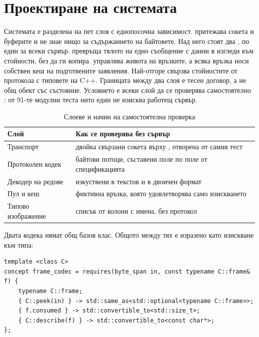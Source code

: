 \section{Проектиране на системата}
\label{sec:design}

Системата е разделена на пет слоя с еднопосочна зависимост.  притежава
сокета и буферите и не знае нищо за съдържанието на байтовете. Над него стоят два
, по един за всеки сървър.  превръща тялото
на едно съобщение с данни в изгледи към стойности, без да ги копира.  управлява
живота на връзките, а всяка връзка носи собствен кеш на подготвените заявления. Най-отгоре
 свързва стойностите от протокола с типовете на C++.
Границата между два слоя е тесен договор, а не общ обект със състояние. Условието е всеки
слой да се проверява самостоятелно : от 91-те модулни теста нито един не
изисква работещ сървър.

\begin{table}[H]
\centering
\caption{Слоеве и начин на самостоятелна проверка}
\label{tab:layers}
\begin{tabular}{L{4.0cm}L{9.4cm}}
\toprule
\textbf{Слой} & \textbf{Как се проверява без сървър} \\
\midrule
Транспорт & двойка свързани сокета върху , отворена от самия тест \\
Протоколен кодек & байтови потоци, съставени поле по поле от спецификацията \\
Декодер на редове & изкуствени  в текстов и в двоичен формат \\
Пул и кеш & фиктивна връзка, която удовлетворява само изискването  \\
Типово изображение & списък от колони с имена, без протокол \\
\bottomrule
\end{tabular}
\end{table}

Двата кодека нямат общ базов клас. Общото между тях е изразено като изискване към типа:

\begin{lstlisting}[caption={Договорът между двата кодека, изразен като изискване към типа},label={lst:concept}]
template <class C>
concept frame_codec = requires(byte_span in, const typename C::frame& f) {
    typename C::frame;
    { C::peek(in) } -> std::same_as<std::optional<typename C::frame>>;
    { f.consumed } -> std::convertible_to<std::size_t>;
    { C::describe(f) } -> std::convertible_to<const char*>;
};
\end{lstlisting}

